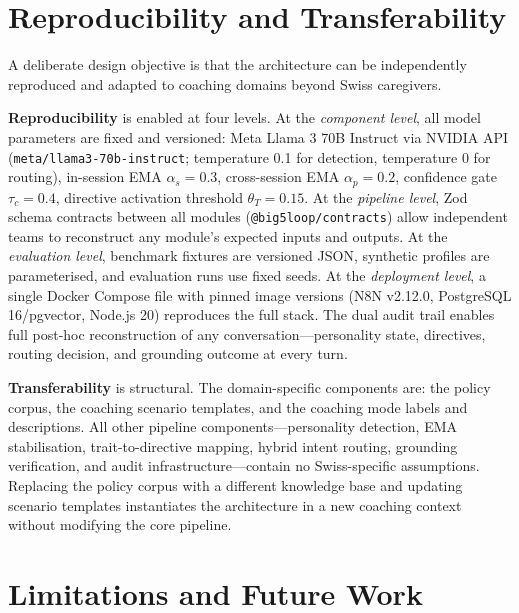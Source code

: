 \documentclass[10pt,a4paper]{report}
\begin{document}
\section{Reproducibility and Transferability}

A deliberate design objective is that the architecture can be independently reproduced and adapted to coaching domains beyond Swiss caregivers.

\textbf{Reproducibility} is enabled at four levels. At the \emph{component level}, all model parameters are fixed and versioned: Meta Llama 3 70B Instruct via NVIDIA API (\texttt{meta/llama3-70b-instruct}; temperature 0.1 for detection, temperature 0 for routing), in-session EMA $\alpha_s = 0.3$, cross-session EMA $\alpha_p = 0.2$, confidence gate $\tau_c = 0.4$, directive activation threshold $\theta_T = 0.15$. At the \emph{pipeline level}, Zod schema contracts between all modules (\texttt{@big5loop/contracts}) allow independent teams to reconstruct any module's expected inputs and outputs. At the \emph{evaluation level}, benchmark fixtures are versioned JSON, synthetic profiles are parameterised, and evaluation runs use fixed seeds. At the \emph{deployment level}, a single Docker Compose file with pinned image versions (N8N v2.12.0, PostgreSQL 16/pgvector, Node.js 20) reproduces the full stack. The dual audit trail enables full post-hoc reconstruction of any conversation---personality state, directives, routing decision, and grounding outcome at every turn.

\textbf{Transferability} is structural. The domain-specific components are: the policy corpus, the coaching scenario templates, and the coaching mode labels and descriptions. All other pipeline components---personality detection, EMA stabilisation, trait-to-directive mapping, hybrid intent routing, grounding verification, and audit infrastructure---contain no Swiss-specific assumptions. Replacing the policy corpus with a different knowledge base and updating scenario templates instantiates the architecture in a new coaching context without modifying the core pipeline.

\section{Limitations and Future Work}
\end{document}
